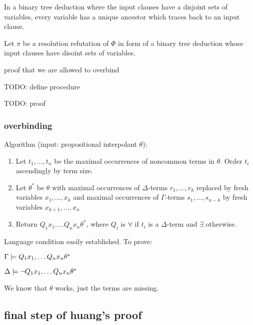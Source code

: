 In a binary tree deduction where the input clauses have a disjoint sets of variables, every variable has a unique ancestor which traces back to an input clause. 

\begin{lemma}
	Let $\pi$ be a resolution refutation of $\Phi$ in form of a binary tree deduction whose input clauses have disoint sets of variables. 



\end{lemma}

\clearpage









	proof that we are allowed to overbind

	TODO: define procedure

	TODO: proof



	\subsubsection{overbinding}

	Algorithm (input: propositional interpolant $\theta$):
	\begin{enumerate}
		\item Let $t_1, \ldots, t_n$ be the maximal occurrences of noncommon terms in $\theta$. Order $t_i$ ascendingly by term size. 
		\item Let $\theta^*$ be $\theta$ with maximal occurrences of $\Delta$-terms $r_1, \ldots, r_k$ replaced by fresh variables $x_1, \ldots, x_k$ and maximal occurrences of $\Gamma$-terms $s_1, \ldots, s_{n-k}$ by fresh variables $x_{k+1}, \ldots, x_{n}$
		\item Return $Q_1 x_1, \ldots Q_n x_n \theta^*$, where $Q_i$ is $\forall$ if $t_i$ is a $\Delta$-term and $\exists$ otherwise.
	\end{enumerate}

	Language condition easily established. To prove:

	$\Gamma \models Q_1 x_1, \ldots Q_n x_n \theta^*$

	$\Delta \models \lnot Q_1 x_1, \ldots Q_n x_n \theta^*$

	We know that $\theta$ works, just the terms are missing.

\subsection{final step of huang's proof}

